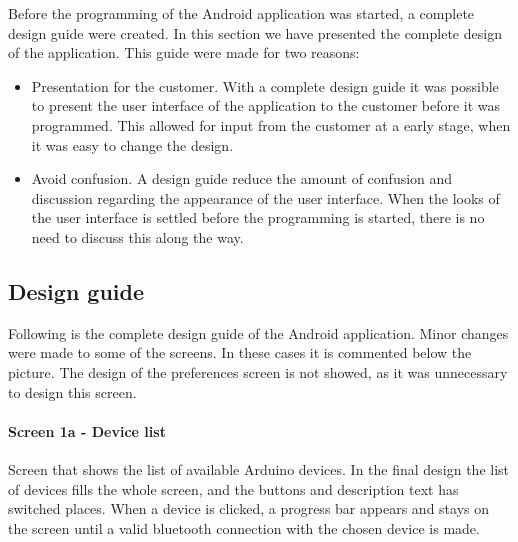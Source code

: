 Before the programming of the Android application was started, a complete design guide were created. In this section we have presented the complete design of the application. This guide were made for two reasons:
\begin{itemize}
	\item{Presentation for the customer.} With a complete design guide it was possible to present the user interface of the application to the customer before it was programmed. This allowed for input from the customer at a early stage, when it was easy to change the design.
	\item{Avoid confusion.} A design guide reduce the amount of confusion and discussion regarding the appearance of the user interface. When the looks of the user interface is settled before the programming is started, there is no need to discuss this along the way. 
\end{itemize}

\subsection{Design guide}
Following is the complete design guide of the Android application. Minor changes were made to some of the screens. In these cases it is commented below the picture. The design of the preferences screen is not showed, as it was unnecessary to design this screen.

\paragraph{Screen 1a - Device list}
Screen that shows the list of available Arduino devices. In the final design the list of devices fills the whole screen, and the buttons and description text has switched places. When a device is clicked, a progress bar appears and stays on the screen until a valid bluetooth connection with the chosen device is made.

